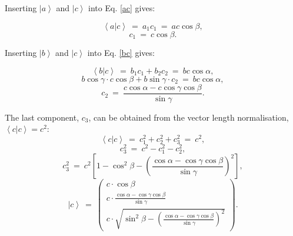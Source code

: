Inserting $\left| a \right>$ and $\left| c \right>$ into Eq. \ref{ac} gives:

\begin{equation} \left< a | c \right > \ =\  a_1 c_1 \ =\  ac \cos \beta, \end{equation}
\begin{equation} c_1 \ =\  c \cos \beta. \end{equation}



Inserting $\left| b \right>$ and $\left| c \right>$ into Eq. \ref{bc} gives:

\begin{equation} \left< b | c \right > \ =\  b_1 c_1 + b_2 c_2 \ =\  bc \cos \alpha, \end{equation}
\begin{equation} b \cos \gamma \cdot c \cos \beta + b \sin \gamma \cdot c_2 \ =\  bc \cos \alpha, \end{equation}
\begin{equation} c_2 \ =\  \frac{c \cos \alpha - c \cos \gamma \cos \beta}{\sin \gamma}. \end{equation}



The last component, $c_3$, can be obtained from the vector length normalisation, $ \left< c | c \right> = c^2 $:
\begin{equation} \left< c | c \right > \ =\  c_1^2 + c_2^2 + c_3^2 \ =\  c^2, \end{equation}
\begin{equation} c_3^2 \ =\  c^2 - c_1^2 - c_2^2, \end{equation}
\begin{equation} 
	c_3^2 \ =\  c^2 \left[1 - \cos^2 \beta - \left(\frac{\cos \alpha - \cos \gamma \cos \beta}{\sin \gamma} \right)^2 \right], 
\end{equation}
\begin{equation} \boxed{ \left| c \right> \ =\  \left( \begin{array}{c}
	c \cdot \cos \beta \\
	c \cdot \frac{\cos \alpha - \cos \gamma \cos \beta}{\sin \gamma} \\
	c \cdot \sqrt{ \sin^2 \beta - \left(\frac{\cos \alpha - \cos \gamma \cos \beta}{\sin \gamma} \right)^2 }
\end{array} \right). } \end{equation}



